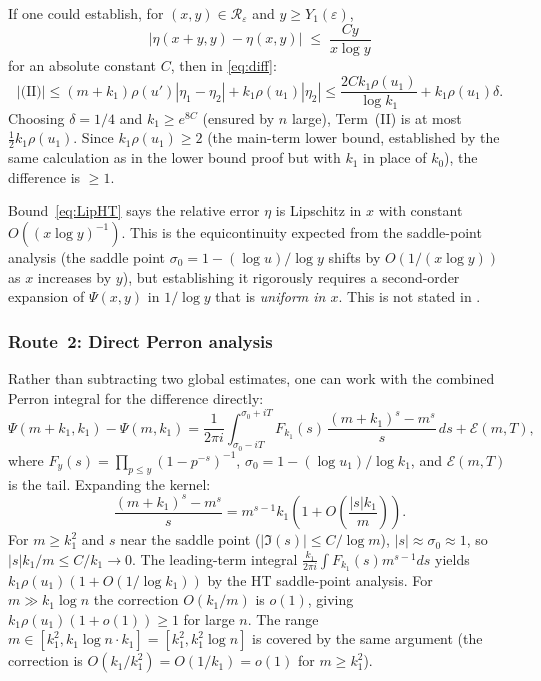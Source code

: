 \documentclass[12pt]{article}
\theoremstyle{definition}
\begin{document}
If one could establish, for $(x,y)\in\mathcal{R}_\varepsilon$ and $y\geq Y_1(\varepsilon)$,
\begin{equation}\label{eq:LipHT}
  \bigl|\eta(x+y,y) - \eta(x,y)\bigr| \;\leq\; \frac{Cy}{x\log y}
\end{equation}
for an absolute constant $C$, then in \eqref{eq:diff}:
\[
  |\text{(II)}|
  \leq (m+k_1)\rho(u')|\eta_1 - \eta_2| + k_1\rho(u_1)|\eta_2|
  \leq \frac{2Ck_1\rho(u_1)}{\log k_1} + k_1\rho(u_1)\delta.
\]
Choosing $\delta = 1/4$ and $k_1 \geq e^{8C}$ (ensured by $n$ large),
Term~(II) is at most $\tfrac12 k_1\rho(u_1)$.
Since $k_1\rho(u_1) \geq 2$ (the main-term lower bound, established by the
same calculation as in the lower bound proof but with $k_1$ in place of $k_0$),
the difference is $\geq 1$.

Bound~\eqref{eq:LipHT} says the relative error $\eta$ is Lipschitz in $x$
with constant $O((x\log y)^{-1})$.
This is the equicontinuity expected from the saddle-point analysis
(the saddle point $\sigma_0 = 1 - (\log u)/\log y$ shifts by $O(1/(x\log y))$
as $x$ increases by $y$), but establishing it rigorously requires a
second-order expansion of $\Psi(x,y)$ in $1/\log y$ that is \emph{uniform in $x$}.
This is not stated in \cite{HT,Ten}.

\subsubsection*{Route~2: Direct Perron analysis}

Rather than subtracting two global estimates, one can work with
the combined Perron integral for the difference directly:
\begin{equation}\label{eq:PerronSI}
  \Psi(m+k_1,k_1) - \Psi(m,k_1)
  = \frac{1}{2\pi i}\int_{\sigma_0 - iT}^{\sigma_0+iT}
    F_{k_1}(s)\,\frac{(m+k_1)^s - m^s}{s}\,ds + \mathcal{E}(m,T),
\end{equation}
where $F_y(s) = \prod_{p\leq y}(1-p^{-s})^{-1}$,
$\sigma_0 = 1 - (\log u_1)/\log k_1$, and $\mathcal{E}(m,T)$ is the tail.
Expanding the kernel:
\begin{equation}\label{eq:kernelexp}
  \frac{(m+k_1)^s - m^s}{s}
  = m^{s-1}k_1\!\left(1 + O\!\left(\frac{|s|k_1}{m}\right)\right).
\end{equation}
For $m \geq k_1^2$ and $s$ near the saddle point ($|\Im(s)| \leq C/\log m$),
$|s| \approx \sigma_0 \approx 1$, so $|s|k_1/m \leq C/k_1 \to 0$.
The leading-term integral $\frac{k_1}{2\pi i}\int F_{k_1}(s)m^{s-1}ds$
yields $k_1\rho(u_1)(1+O(1/\log k_1))$ by the HT saddle-point analysis.
For $m \gg k_1\log n$ the correction $O(k_1/m)$ is $o(1)$, giving
$k_1\rho(u_1)(1+o(1)) \geq 1$ for large $n$.
The range $m \in [k_1^2, k_1\log n \cdot k_1] = [k_1^2, k_1^2\log n]$ is covered by the same argument (the correction is $O(k_1/k_1^2) = O(1/k_1) = o(1)$ for $m \geq k_1^2$).
\end{document}
